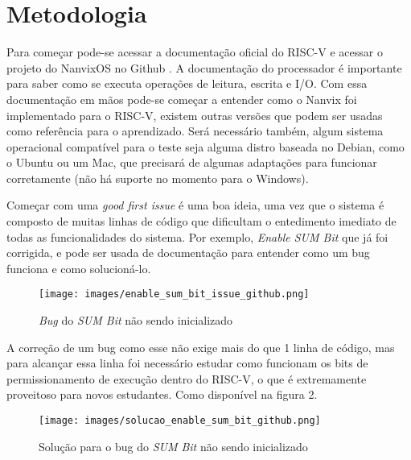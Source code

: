 \section{Metodologia}

Para começar pode-se acessar a documentação oficial do RISC-V \cite{RISCV_documentation} 
e acessar o projeto do NanvixOS no Github \cite{NanvixOS}. A documentação do 
processador é importante para saber como se executa operações de leitura, escrita e I/O. 
Com essa documentação em mãos pode-se começar a entender como o Nanvix foi implementado para o 
RISC-V, existem outras versões que podem ser usadas como referência para o aprendizado. 
Será necessário também, algum sistema operacional compatível para o teste seja alguma 
distro baseada no Debian, como o Ubuntu ou um Mac, que precisará de algumas adaptações 
para funcionar corretamente (não há suporte no momento para o Windows). 

Começar com uma \emph{good first issue} é uma boa ideia, uma vez que o sistema é composto de muitas linhas de 
código que dificultam o entedimento imediato de todas as funcionalidades do sistema. 
Por exemplo, \emph{Enable SUM Bit} \cite{EnableSUMBit} que já foi corrigida, 
e pode ser usada de documentação para entender como um bug funciona e como solucioná-lo.

\begin{figure}[h!]
    \centering
    \texttt{[image: images/enable\_sum\_bit\_issue\_github.png]}
    \caption{\emph{Bug} do \emph{SUM Bit} não sendo inicializado}
\end{figure}

A correção de um bug como esse não exige mais do que 1 linha de código, mas para alcançar 
essa linha foi necessário estudar como funcionam os bits de permissionamento de execução 
dentro do RISC-V, o que é extremamente proveitoso para novos estudantes. Como disponível na figura 2.

\begin{figure}[h!]
    \centering
    \texttt{[image: images/solucao\_enable\_sum\_bit\_github.png]}
    \caption{Solução para o bug do \emph{SUM Bit} não sendo inicializado \\ \cite{SolucaoEnableSUMBit}}
\end{figure}